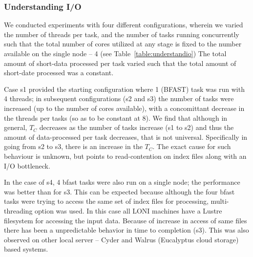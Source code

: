 \documentclass{acm_proc_article-sp}
\begin{document}
\subsubsection{Understanding I/O}

We conducted experiments with four different configurations, wherein
we varied the number of threads per task, and the number of tasks
running concurrently such that the total number of cores utilized at
any stage is fixed to the number available on the single node -- 4
(see Table~\ref{table:understandio}) The total amount of short-data
processed per task varied such that the total amount of short-date
processed was a constant.

Case s1 provided the starting configuration where 1 (BFAST) task was
run with 4 threads; in subsequent configurations (s2 and s3) the
number of tasks were increased (up to the number of cores available),
with a concomittant decrease in the threads per tasks (so as to be
constant at 8). We find that although in general, $T_C$ decreases as
the number of tasks increase (s1 to s2) and thus the amount of
data-processed per task decreases, that is not universal. Specifically
in going from s2 to s3, there is an increase in the $T_C$.  The exact
cause for such behaviour is unknown, but points to read-contention on
index files along with an I/O bottleneck.


In the case of s4, 4 bfast tasks were also run on a single node; the
performance was better than for s3. This can be expected because
although the four bfast tasks were trying to access the same set of
index files for processing, multi-threading option was used.  In this
case all LONI machines have a Lustre filesystem for accessing the
input data.  Because of increase in access of same files there has
been a unpredictable behavior in time to completion (s3). This was
also observed on other local server -- Cyder and Walrus (Eucalyptus
cloud storage) based systems.

\end{document}
